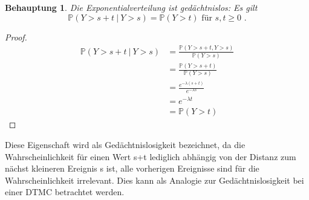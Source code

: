 \documentclass[a4paper]{scrartcl}
\newtheorem*{behaupt}{Behauptung}
\newcommand{\prob}{\mathbb{P}}
\def \blattnr {4}
\begin{document}
\begin{enumerate}[label=\bfseries \blattnr.\arabic*]
\begin{enumerate}
                \begin{behaupt}
                    Die Exponentialverteilung ist gedächtnislos:
                    Es gilt
                    \begin{equation*}
                        \prob(Y > s + t\ |\ Y > s) = \prob(Y > t)
                        \text{ für }
                        s,t \geq 0
                        \text{ .}
                    \end{equation*}
                \end{behaupt}
                \begin{proof}
                    \begin{equation*}
                        \begin{split}
                            \prob(Y > s + t\ |\ Y > s)
                            &= \frac{\prob(Y > s+t, Y > s)}{\prob(Y > s)} \\
                            &= \frac{\prob(Y > s+t)}{\prob(Y > s)} \\
                            &= \frac{e^{-\lambda (s+t)}}{e^{-\lambda s}} \\
                            &= e^{-\lambda t} \\
                            &= \prob(Y > t)
                        \end{split}
                    \end{equation*}
                \end{proof}
                
                Diese Eigenschaft wird als Gedächtnislosigkeit bezeichnet, da
                die Wahrscheinlichkeit für einen Wert s+t lediglich abhängig
                von der Distanz zum nächst kleineren Ereignis s ist, alle
                vorherigen Ereignisse sind für die Wahrscheinlichkeit
                irrelevant. Dies kann als Analogie zur Gedächtnislosigkeit bei
                einer DTMC betrachtet werden.


\end{enumerate}
\end{enumerate}
\end{document}
